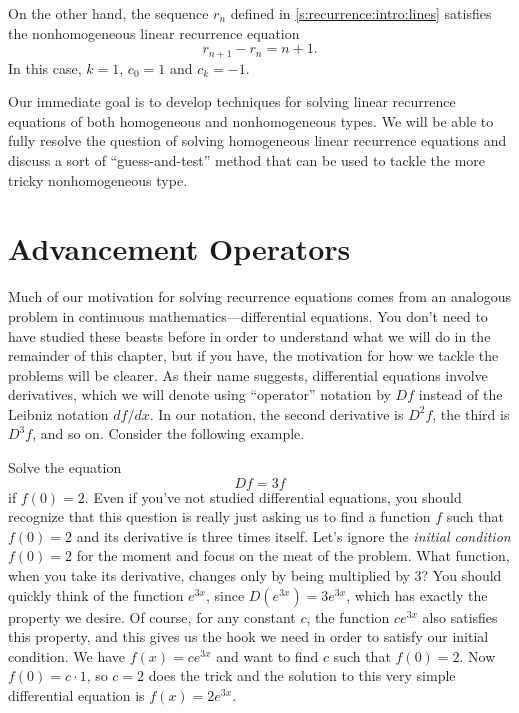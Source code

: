 On the other hand, the sequence $r_n$ defined in
\autoref{s:recurrence:intro:lines} satisfies the nonhomogeneous
linear recurrence equation
\[
r_{n+1} - r_{n} = n+1.
\]
In this case, $k=1$, $c_0=1$ and $c_k=-1$.

Our immediate goal is to develop techniques for solving linear
recurrence equations of both homogeneous and nonhomogeneous types. We
will be able to fully resolve the question of solving homogeneous
linear recurrence equations and discuss a sort of ``guess-and-test''
method that can be used to tackle the more tricky nonhomogeneous type.

\section{Advancement Operators}\label{s:recurrence:adv-ops}

Much of our motivation for solving recurrence equations comes from an
analogous problem in continuous mathematics---differential
equations. You don't need to have studied these beasts before in order
to understand what we will do in the remainder of this chapter, but if
you have, the motivation for how we tackle the problems will be
clearer. As their name suggests, differential equations involve
derivatives, which we will denote using ``operator'' notation by $Df$
instead of the Leibniz notation $df/dx$. In our notation, the second
derivative is $D^2 f$, the third is $D^3 f$, and so on. Consider the
following example.

\begin{example}\label{ex:recurrence:diffeq}
  Solve the equation
  \[Df = 3f\] if $f(0) = 2$. Even if you've not studied differential
  equations, you should recognize that this question is really just
  asking us to find a function $f$ such that $f(0)=2$ and its
  derivative is three times itself. Let's ignore the \emph{initial
    condition} $f(0)=2$ for the moment and focus on the meat of the
  problem. What function, when you take its derivative, changes only
  by being multiplied by $3$?  You should quickly think of the
  function $e^{3x}$, since $D(e^{3x}) = 3e^{3x}$, which has exactly
  the property we desire. Of course, for any constant $c$, the
  function $ce^{3x}$ also satisfies this property, and this gives us
  the hook we need in order to satisfy our initial condition. We have
  $f(x) = ce^{3x}$ and want to find $c$ such that $f(0)=2$. Now $f(0)
  = c\cdot 1$, so $c=2$ does the trick and the solution to this very
  simple differential equation is $f(x) = 2e^{3x}$.
\end{example}

